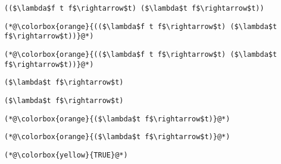 \documentclass{beamer}
\begin{document}
\begin{frame}[fragile]{\CurrentSection}
\lstset{basicstyle=\ttfamily\small}\lstset{numbers=none}\lstset{language=ML}\begin{lstlisting}
(($\lambda$f t f$\rightarrow$t) ($\lambda$t f$\rightarrow$t))
\end{lstlisting}
\pause\lstset{language=ML}\begin{lstlisting}
(*@\colorbox{orange}{(($\lambda$f t f$\rightarrow$t) ($\lambda$t f$\rightarrow$t))}@*)
\end{lstlisting}

\end{frame}

\begin{frame}[fragile]{\CurrentSection}
\lstset{basicstyle=\ttfamily\small}\lstset{numbers=none}\lstset{language=ML}\begin{lstlisting}
(*@\colorbox{orange}{(($\lambda$f t f$\rightarrow$t) ($\lambda$t f$\rightarrow$t))}@*)
\end{lstlisting}
\pause\lstset{language=ML}\begin{lstlisting}
($\lambda$t f$\rightarrow$t)
\end{lstlisting}

\end{frame}

\begin{frame}[fragile]{\CurrentSection}
\lstset{basicstyle=\ttfamily\small}\lstset{numbers=none}\lstset{language=ML}\begin{lstlisting}
($\lambda$t f$\rightarrow$t)
\end{lstlisting}
\pause\lstset{language=ML}\begin{lstlisting}
(*@\colorbox{orange}{($\lambda$t f$\rightarrow$t)}@*)
\end{lstlisting}

\end{frame}

\begin{frame}[fragile]{\CurrentSection}
\lstset{basicstyle=\ttfamily\small}\lstset{numbers=none}\lstset{language=ML}\begin{lstlisting}
(*@\colorbox{orange}{($\lambda$t f$\rightarrow$t)}@*)
\end{lstlisting}
\pause\lstset{language=ML}\begin{lstlisting}
(*@\colorbox{yellow}{TRUE}@*)
\end{lstlisting}

\end{frame}
\end{document}
